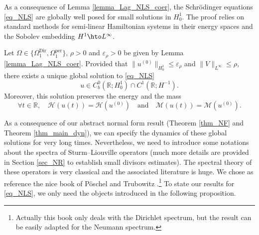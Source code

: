As a consequence of Lemma \ref{lemma_Lag_NLS_coer}, the Schrödinger equations \eqref{eq_NLS} are globally well posed for small solutions in $H^1_0$.
The proof relies on standard methods for semi-linear Hamiltonian systems in their energy spaces and the Sobolev embedding $H^1 \hto L^{\infty}$.
\begin{theorem}[Global well-posedness, $d=1$, {\cite[Cor.\,3.5.3, p.\,77]{Caz03}}]
\label{thm_GWP_NLS_1d}
Let $\Omega \in \{ \Omega^{\mathrm{Dir}}_1, \Omega^{\mathrm{per}}_1 \}$, $\rho >0$ and $\varepsilon_{\rho}>0$ be given by Lemma \ref{lemma_Lag_NLS_coer}. Provided that $\|u^{(0)} \|_{H^1_0} \leq \varepsilon_{\rho}$ and $\| V\|_{L^\infty} \leq \rho$, there exists a unique global solution to \eqref{eq_NLS}
\[
u \in C^0_b(\mathbb{R}; H^1_0) \cap C^1(\mathbb{R};H^{-1}).
\]
Moreover, this solution preserves the energy and the mass
\[
\forall t\in \mathbb{R}, \quad \mathcal{H}(u(t)) = \mathcal{H}(u^{(0)}) \quad \text{and} \quad \mathcal{M}(u(t)) = \mathcal{M}(u^{(0)}).
\]
\end{theorem}

As a consequence of our abstract normal form result (\ie Theorem \ref{thm_NF} and Theorem \ref{thm_main_dyn}), we can specify the dynamics of these global solutions for very long times. Nevertheless, we need to introduce some notations about the spectra of Sturm--Liouville operators (much more details are provided in Section \ref{sec_NR} to establish small divisors estimates). The spectral theory of these operators is very classical and the associated literature is huge. We chose as reference the nice book of Pöschel and Trubowitz \cite{PT}.\footnote{Actually this book only deals with the Dirichlet spectrum, but the result can be easily adapted for the Neumann spectrum.} To state our results for \eqref{eq_NLS}, we only need the objects introduced in the following proposition.

